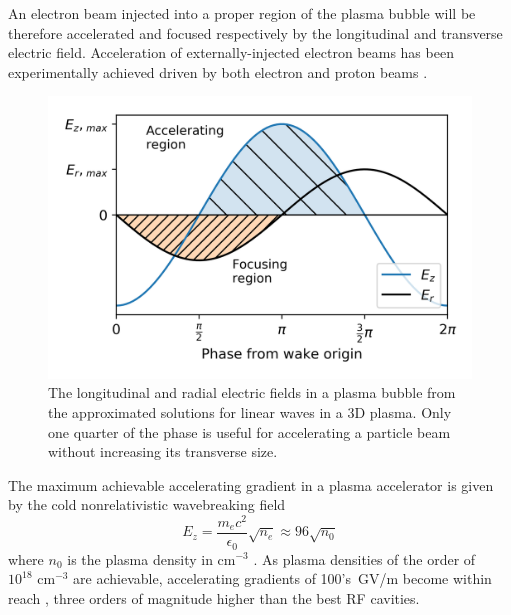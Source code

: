 An electron beam injected into a proper region of the plasma bubble will be therefore accelerated and focused respectively by the longitudinal and transverse electric field. Acceleration of externally-injected electron beams has been experimentally achieved driven by both electron \cite{Litos:2014yqa} and proton beams \cite{Adli:2018end}.

\begin{figure}[!b]
\centering
\includegraphics[scale=0.8, keepaspectratio]{pictures/Plasma_focusing_theory}
\caption{The longitudinal and radial electric fields in a plasma bubble from the approximated solutions for linear waves in a 3D plasma. Only one quarter of the phase is useful for accelerating a particle beam without increasing its transverse size. }
\label{fig:plasma_focusing}
\end{figure}


The maximum achievable accelerating gradient in a plasma accelerator is given by the cold nonrelativistic wavebreaking field  
\begin{equation}
E_z = \frac{m_e c^2}{\epsilon_0} \sqrt{n_e} \approx 96 \sqrt{n_0}\label{eq:gradient_max}
\end{equation}
where $n_0$ is the plasma density in $\mathrm{cm}^{-3}$ \cite{Chen:1984up, RevModPhys.81.1229}. As plasma densities of the order of $10^{18} \text{ cm}^{-3}$ are achievable,  accelerating gradients of 100's~GV/m become within reach \cite{Blumenfeld:2007ph, Malka1596}, three orders of magnitude higher than the best RF cavities. 


